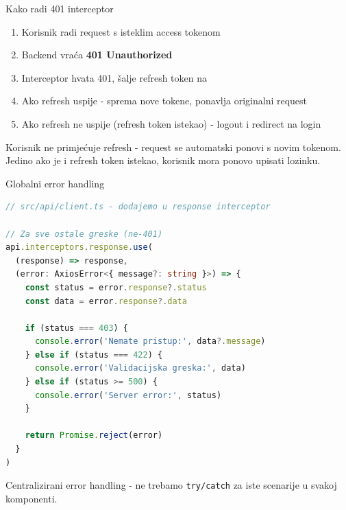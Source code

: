 \begin{frame}{Kako radi 401 interceptor}
\begin{enumerate}
  \item Korisnik radi request s isteklim access tokenom
  \item Backend vraća \textbf{401 Unauthorized}
  \item Interceptor hvata 401, šalje refresh token na 
  \item Ako refresh uspije - sprema nove tokene, ponavlja originalni request
  \item Ako refresh ne uspije (refresh token istekao) - logout i redirect na login
\end{enumerate}

\vspace{0.6em}
Korisnik ne primjećuje refresh - request se automatski ponovi s novim tokenom. Jedino ako je i refresh token istekao, korisnik mora ponovo upisati lozinku.
\end{frame}

\begin{frame}[fragile,shrink=5]{Globalni error handling}
\begin{lstlisting}[language=typescript]
// src/api/client.ts - dodajemo u response interceptor

// Za sve ostale greske (ne-401)
api.interceptors.response.use(
  (response) => response,
  (error: AxiosError<{ message?: string }>) => {
    const status = error.response?.status
    const data = error.response?.data

    if (status === 403) {
      console.error('Nemate pristup:', data?.message)
    } else if (status === 422) {
      console.error('Validacijska greska:', data)
    } else if (status >= 500) {
      console.error('Server error:', status)
    }

    return Promise.reject(error)
  }
)
\end{lstlisting}

\vspace{0.4em}
Centralizirani error handling - ne trebamo \texttt{try/catch} za iste scenarije u svakoj komponenti.
\end{frame}

